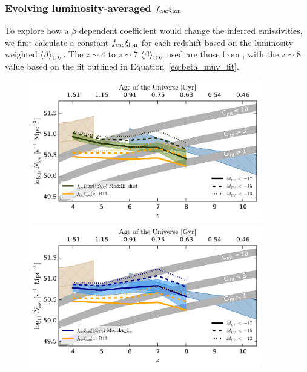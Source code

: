 \subsubsection{Evolving luminosity-averaged $f_{\rm{esc}}\xi_{\rm{ion}}$}
To explore how a $\beta$ dependent coefficient would change the inferred emissivities, we first calculate a constant $f_{\rm{esc}}\xi_{\rm{ion}}$ for each redshift based on the luminosity weighted $\left \langle \beta  \right \rangle_{\rm{UV}}$. The $z\sim4$ to $z\sim7$ $\left \langle \beta  \right \rangle_{\rm{UV}}$ used are those from \citet{Bouwens:2013vf}, with the $z\sim8$ value based on the fit outlined in Equation~\ref{eq:beta_muv_fit}. 

\begin{figure}
\centering
  \includegraphics[width=0.9\textwidth]{plots/Fig9a.pdf}
  \includegraphics[width=0.9\textwidth]{plots/Fig9b.pdf}

\end{figure}
